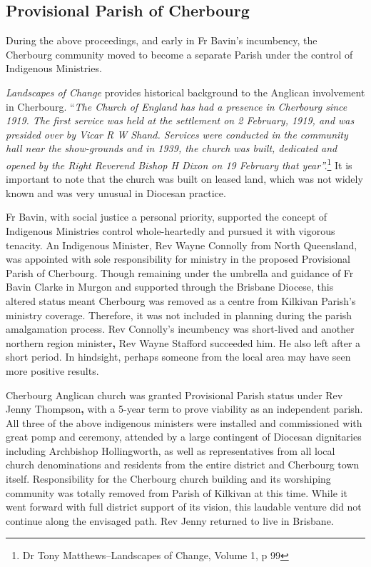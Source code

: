 \subsection{Provisional Parish of Cherbourg}



During the above proceedings, and early in Fr Bavin's incumbency, the Cherbourg community moved to become a separate Parish under the control of Indigenous Ministries.



\emph{Landscapes of Change} provides historical background to the Anglican involvement in Cherbourg. ``\emph{The Church of England has had a presence in Cherbourg since 1919. The first service was held at the settlement on 2 February, 1919, and was presided over by Vicar R W Shand. Services were conducted in the community hall near the show-grounds and in 1939, the church was built, dedicated and opened by the Right Reverend Bishop H Dixon on 19 February that year''.}\footnote{Dr Tony Matthews--Landscapes of Change, Volume 1, p 99} It is important to note that the church was built on leased land, which was not widely known and was very unusual in Diocesan practice.


Fr Bavin, with social justice a personal priority, supported the concept of Indigenous Ministries control whole-heartedly and pursued it with vigorous tenacity. An Indigenous Minister, Rev Wayne Connolly from North Queensland, was appointed with sole responsibility for ministry in the proposed Provisional Parish of Cherbourg. Though remaining under the umbrella and guidance of Fr Bavin Clarke in Murgon and supported through the Brisbane Diocese, this altered status meant Cherbourg was removed as a centre from Kilkivan Parish's ministry coverage. Therefore, it was not included in planning during the parish amalgamation process. Rev Connolly's incumbency was short-lived and another northern region minister\textbf{,} Rev Wayne Stafford succeeded him. He also left after a short period. In hindsight, perhaps someone from the local area may have seen more positive results.



Cherbourg Anglican church was granted Provisional Parish status under Rev Jenny Thompson\textbf{,} with a 5-year term to prove viability as an independent parish. All three of the above indigenous ministers were installed and commissioned with great pomp and ceremony, attended by a large contingent of Diocesan dignitaries including Archbishop Hollingworth, as well as representatives from all local church denominations and residents from the entire district and Cherbourg town itself. Responsibility for the Cherbourg church building and its worshiping community was totally removed from Parish of Kilkivan at this time. While it went forward with full district support of its vision, this laudable venture did not continue along the envisaged path. Rev Jenny returned to live in Brisbane.




